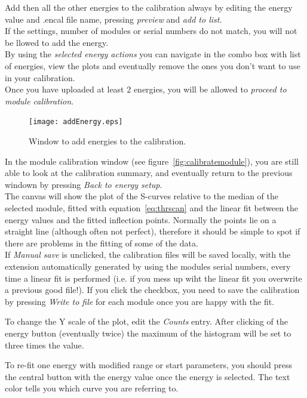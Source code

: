 Add then all the other energies to the calibration always by editing the energy value and .encal file name, pressing \textit{preview} and \textit{add to list}.\\
If the settings, number of modules or serial numbers do not match, you will not be llowed to add the energy.\\
By using the \textit{selected energy actions} you can navigate in the combo box with list of energies, view the plots and eventually remove the ones you don't want to use in your calibration.\\
Once you have uploaded at least 2 energies, you will be allowed to  \textit{proceed to module calibration}.



\begin{figure}
\caption{Window to add energies to the calibration.} \label{fig:addenergy}
\texttt{[image: addEnergy.eps]}
\end{figure} 

In the module calibration window (see figure~\ref{fig:calibratemodule}), you are still able to look at the calibration summary, and eventually return to the previous windown by pressing \textit{Back to energy setup}.\\
The canvas will show the plot of the S-curves relative to the median of the selected module, fitted with equation~\ref{eq:thrscan} and the linear fit between the energy values and the fitted inflection points.
Normally the points lie on a straight line (although often not perfect), therefore it should be simple to spot if there are problems in the fitting of some of the data.\\
If \textit{Manual save} is unclicked, the calibration files will be saved locally, with the extension automatically generated by using the modules serial numbers, every time a linear fit is performed (i.e. if you mess up wiht the linear fit you overwrite a previous good file!). If you click the checkbox, you need to save the calibration by pressing \textit{Write to file} for each module once you are happy with the fit.

To change the Y scale of the plot, edit the \textit{Counts} entry. After clicking of the energy button (eventually twice) the maximum of the histogram will be set to three times the value.

To re-fit one energy with modified range or start parameters, you should press the central button with the energy value once the energy is selected. The text color tells you which curve you are referring to.\\

